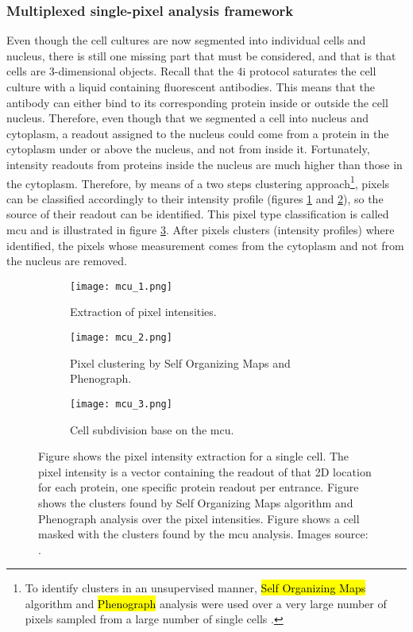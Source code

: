 \subsubsection{Multiplexed single-pixel analysis framework}
Even though the cell cultures are now segmented into individual cells and nucleus, there is still one missing part that must be considered, and that is that cells are 3-dimensional objects. Recall that the \gls{4i} protocol saturates the cell culture with a liquid containing fluorescent antibodies. This means that the antibody can either bind to its corresponding protein inside or outside the cell nucleus. Therefore, even though that we segmented a cell into nucleus and cytoplasm, a readout assigned to the nucleus could come from a protein in the cytoplasm under or above the nucleus, and not from inside it. Fortunately, intensity readouts from proteins inside the nucleus are much higher than those in the cytoplasm. Therefore, by means of a two steps clustering approach\footnote{To identify clusters in an unsupervised manner, \hl{Self Organizing Maps} algorithm and \hl{Phenograph} analysis were used over a very large number of pixels sampled from a large number of single cells \cite{Guteaar7042}.}, pixels can be classified accordingly to their intensity profile (figures \ref{fig:mcu:1} and \ref{fig:mcu:2}), so the source of their readout can be identified. This pixel type classification is called \Acrfull{mcu} and is illustrated in figure \ref{fig:mcu:3}. After pixels clusters (intensity profiles) where identified, the pixels whose measurement comes from the cytoplasm and not from the nucleus are removed.

\begin{figure}[htb]
  \centering
  \begin{subfigure}[t]{.3\linewidth}
    \texttt{[image: mcu\_1.png]}
    \caption{Extraction of pixel intensities.}
    \label{fig:mcu:1}
  \end{subfigure}
  \hspace{4mm}
  \begin{subfigure}[t]{.3\linewidth}
    \texttt{[image: mcu\_2.png]}
    \caption{Pixel clustering by Self Organizing Maps and Phenograph.}
    \label{fig:mcu:2}
  \end{subfigure}
  \hspace{4mm}
  \begin{subfigure}[t]{.3\linewidth}
    \texttt{[image: mcu\_3.png]}
    \caption{Cell subdivision base on the \gls{mcu}.}
    \label{fig:mcu:3}
  \end{subfigure}
  \caption{Figure  shows the pixel intensity extraction for a single cell. The pixel intensity is a vector containing the readout of that 2D location for each protein, one specific protein readout per entrance. Figure  shows the clusters found by Self Organizing Maps algorithm and Phenograph analysis over the pixel intensities. Figure  shows a cell masked with the clusters found by the \gls{mcu} analysis. Images source: \cite{Guteaar7042}.}
  \label{fig:mcu}
\end{figure}

